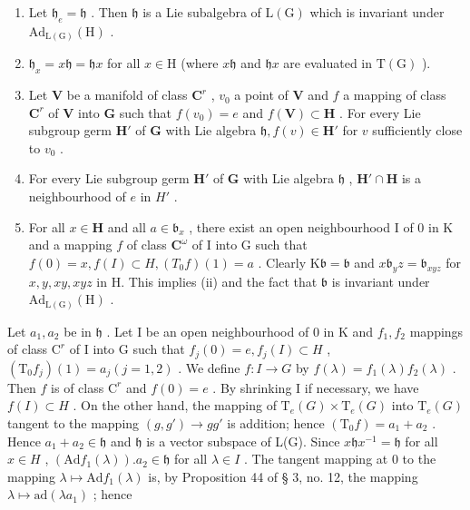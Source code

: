 \begin{enumerate}
\def\labelenumi{(\roman{enumi})}
\item
  Let \(\mathfrak{h}_e = \mathfrak{h}\) . Then \(\mathfrak{h}\) is a Lie subalgebra of \(\mathrm{L}(\mathrm{G})\) which is invariant under \(\mathrm{Ad}_{\mathrm{L}(\mathrm{G})}(\mathrm{H})\) .
\item
  \(\mathfrak{h}_x = x\mathfrak{h} = \mathfrak{h}x\) for all \(x\in \mathrm{H}\) (where \(x\mathfrak{h}\) and \(\mathfrak{h}x\) are evaluated in \(\mathrm{T(G)}\) ).
\item
  Let \(\mathbf{V}\) be a manifold of class \(\mathbf{C}^r\) , \(v_0\) a point of \(\mathbf{V}\) and \(f\) a mapping of class \(\mathbf{C}^r\) of \(\mathbf{V}\) into \(\mathbf{G}\) such that \(f(v_0) = e\) and \(f(\mathbf{V}) \subset \mathbf{H}\) . For every Lie subgroup germ \(\mathbf{H}'\) of \(\mathbf{G}\) with Lie algebra \(\mathfrak{h}, f(v) \in \mathbf{H}'\) for \(v\) sufficiently close to \(v_0\) .
\item
  For every Lie subgroup germ \(\mathbf{H}'\) of \(\mathbf{G}\) with Lie algebra \(\mathfrak{h}\) , \(\mathbf{H}' \cap \mathbf{H}\) is a neighbourhood of \(e\) in \(H'\) .
\item
  For all \(x \in \mathbf{H}\) and all \(a \in \mathfrak{b}_x\) , there exist an open neighbourhood I of 0 in K and a mapping \(f\) of class \(\mathbf{C}^{\omega}\) of I into G such that \(f(0) = x, f(I) \subset H, (T_0f)(1) = a\) . Clearly \(\mathrm{K}\mathfrak{b} = \mathfrak{b}\) and \(x\mathfrak{b}_y z = \mathfrak{b}_{xyz}\) for \(x, y, xy, xyz\) in H. This implies (ii) and the fact that \(\mathfrak{b}\) is invariant under \(\mathrm{Ad}_{\mathrm{L(G)}}(\mathrm{H})\) .
\end{enumerate}

Let \(a_1, a_2\) be in \(\mathfrak{h}\) . Let I be an open neighbourhood of 0 in K and \(f_1, f_2\) mappings of class \(\mathrm{C}^r\) of I into G such that \(f_j(0) = e, f_j(I) \subset H\) , \((\mathrm{T}_0 f_j)(1) = a_j (j = 1, 2)\) . We define \(f: I \to G\) by \(f(\lambda) = f_1(\lambda)f_2(\lambda)\) . Then \(f\) is of class \(\mathrm{C}^r\) and \(f(0) = e\) . By shrinking I if necessary, we have \(f(I) \subset H\) . On the other hand, the mapping of \(\mathrm{T}_e(G) \times \mathrm{T}_e(G)\) into \(\mathrm{T}_e(G)\) tangent to the mapping \((g, g') \to gg'\) is addition; hence \((\mathrm{T}_0 f) = a_1 + a_2\) . Hence \(a_1 + a_2 \in \mathfrak{h}\) and \(\mathfrak{h}\) is a vector subspace of L(G). Since \(x\mathfrak{h}x^{-1} = \mathfrak{h}\) for all \(x \in H\) , \((\mathrm{Ad}f_1(\lambda)).a_2 \in \mathfrak{h}\) for all \(\lambda \in I\) . The tangent mapping at 0 to the mapping \(\lambda \mapsto \mathrm{Ad}f_1(\lambda)\) is, by Proposition 44 of § 3, no. 12, the mapping \(\lambda \mapsto \mathrm{ad}(\lambda a_1)\) ; hence

